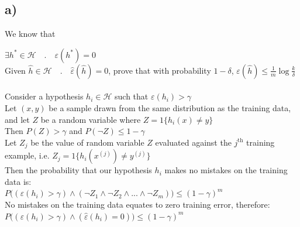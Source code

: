 \documentclass[11pt]{article}
\begin{document}
\subsection*{a)}

We know that

$\exists h^* \in \mathcal{H} \quad.\quad \varepsilon(h^*) = 0$\\

Given $\hat{h} \in \mathcal{H} \quad.\quad \hat{\varepsilon}(\hat{h}) = 0$, prove that with probability $1 - \delta$, $\varepsilon(\hat{h}) \le \frac{1}{m} \log \frac{k}{\delta}$ \\\\

Consider a hypothesis $h_i \in \mathcal{H}$ such that $\varepsilon(h_i) > \gamma$ \\
Let $(x, y)$ be a sample drawn from the same distribution as the training data,\\
and let $Z$ be a random variable where $Z = 1\{h_i(x) \ne y \}$ \\

Then $P(Z) > \gamma$ and $P(\neg Z) \le 1 - \gamma$ \\

Let $Z_j$ be the value of random variable $Z$ evaluated against the $j^{\text{th}}$ training example, i.e. $Z_j = 1\{h_i(x^{(j)}) \ne y^{(j)}\}$ \\

Then the probability that our hypothesis $h_i$ makes no mistakes on the training data is:\\ 
$P\big((\varepsilon(h_i) > \gamma) \land (\neg Z_1 \land \neg Z_2 \land ... \land \neg Z_m)\big) \le (1 - \gamma)^m$ \\

No mistakes on the training data equates to zero training error, therefore:\\
$P\big((\varepsilon(h_i) > \gamma) \land (\hat{\varepsilon}(h_i) = 0)\big) \le (1 - \gamma)^m$ \\
\end{document}

